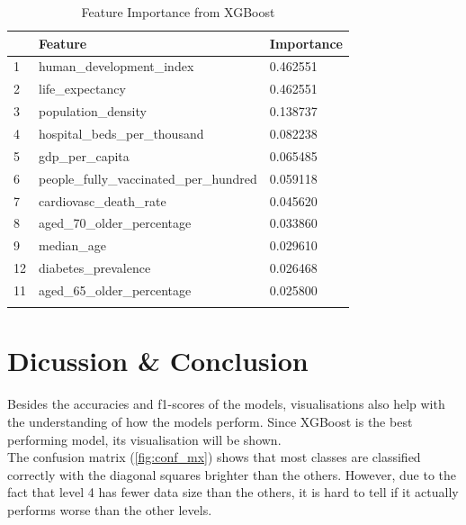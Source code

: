 \documentclass[10pt, a4paper, twocolumn]{article} %
\begin{document}
\begin{table}
	\caption{Feature Importance from XGBoost}
	\centering
	\begin{tabular}{lll}
		\toprule
		& \textbf{Feature} & \textbf{Importance} \\
		\midrule
		1& human\_development\_index & 0.462551 \\
		2& life\_expectancy& 0.462551\\
		3& population\_density& 0.138737\\
		4& hospital\_beds\_per\_thousand& 0.082238\\
		5& gdp\_per\_capita& 0.065485\\
		6& people\_fully\_vaccinated\_per\_hundred& 0.059118\\
		7& cardiovasc\_death\_rate& 0.045620\\
		8& aged\_70\_older\_percentage& 0.033860\\
		9& median\_age& 0.029610\\
		12& diabetes\_prevalence& 0.026468\\
		11& aged\_65\_older\_percentage& 0.025800\\
		\bottomrule
	\label{tab:feature_importance}
	\end{tabular}
\end{table}
\section{Dicussion \& Conclusion}\label{sec:discussion}
Besides the accuracies and f1-scores of the models, visualisations also help with the understanding 
of how the models perform. Since XGBoost is the best performing model, its visualisation will be shown. \\[5pt]

The confusion matrix (\autoref{fig:conf_mx}) shows that most classes are classified correctly with the diagonal squares brighter 
than the others. However, due to the fact that level 4 has fewer data size than the others, it is hard to 
tell if it actually performs worse than the other levels. \\[5pt]
\end{document}
